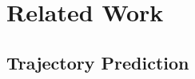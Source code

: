 \documentclass[sigconf]{acmart}
\begin{document}

 

\section{Related Work}


\subsection{Trajectory Prediction}

\end{document}
